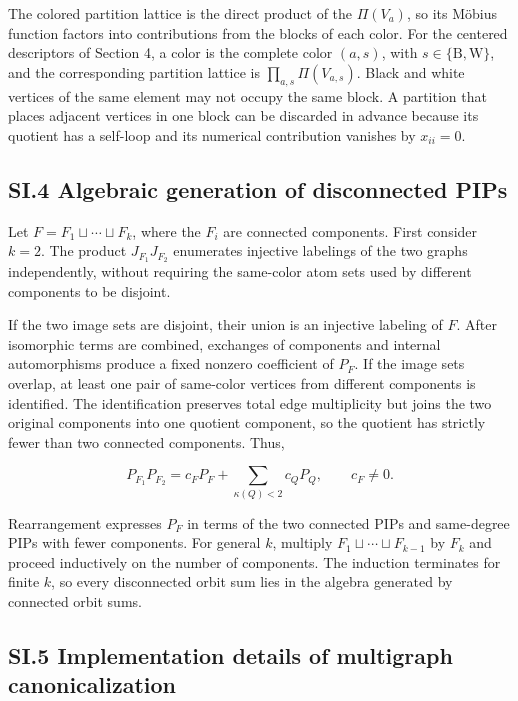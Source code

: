 The colored partition lattice is the direct product of the \(\Pi(V_a)\), so its M\"obius function factors into contributions from the blocks of each color. For the centered descriptors of Section 4, a color is the complete color \((a,s)\), with \(s\in\{\mathrm B,\mathrm W\}\), and the corresponding partition lattice is \(\prod_{a,s}\Pi(V_{a,s})\). Black and white vertices of the same element may not occupy the same block. A partition that places adjacent vertices in one block can be discarded in advance because its quotient has a self-loop and its numerical contribution vanishes by \(x_{ii}=0\).

\subsection{SI.4 Algebraic generation of disconnected PIPs}\label{sec:si-disconnected}

Let \(F=F_1\sqcup\cdots\sqcup F_k\), where the \(F_i\) are connected components. First consider \(k=2\). The product \(J_{F_1}J_{F_2}\) enumerates injective labelings of the two graphs independently, without requiring the same-color atom sets used by different components to be disjoint.

If the two image sets are disjoint, their union is an injective labeling of \(F\). After isomorphic terms are combined, exchanges of components and internal automorphisms produce a fixed nonzero coefficient of \(P_F\). If the image sets overlap, at least one pair of same-color vertices from different components is identified. The identification preserves total edge multiplicity but joins the two original components into one quotient component, so the quotient has strictly fewer than two connected components. Thus,

\[
P_{F_1}P_{F_2}=c_FP_F+\sum_{\kappa(Q)<2}c_QP_Q,
\qquad c_F\ne0.
\]

Rearrangement expresses \(P_F\) in terms of the two connected PIPs and same-degree PIPs with fewer components. For general \(k\), multiply \(F_1\sqcup\cdots\sqcup F_{k-1}\) by \(F_k\) and proceed inductively on the number of components. The induction terminates for finite \(k\), so every disconnected orbit sum lies in the algebra generated by connected orbit sums.

\subsection{SI.5 Implementation details of multigraph canonicalization}\label{sec:si-canonicalization}

